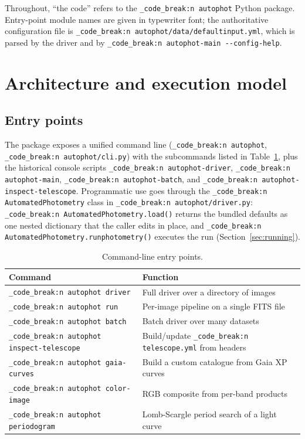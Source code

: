 \documentclass[11pt,a4paper]{article}
\renewcommand{\_}{\autophotunderscore\allowbreak}
\DeclareRobustCommand{\code}[1]{\texttt{\autophot_code_break:n {#1}}}
\begin{document}
Throughout, ``the code'' refers to the \code{autophot} Python package.
Entry-point module names are given in typewriter font; the authoritative
configuration file is \code{autophot/data/default\_input.yml}, which is
parsed by the driver and by \code{autophot-main -{}-config-help}.

\section{Architecture and execution model}
\label{sec:architecture}

\subsection{Entry points}

The package exposes a unified command line (\code{autophot},
\code{autophot/cli.py}) with the subcommands listed in
Table~\ref{tab:cli}, plus the historical console scripts
\code{autophot-driver}, \code{autophot-main}, \code{autophot-batch}, and
\code{autophot-inspect-telescope}. Programmatic use goes through the
\code{AutomatedPhotometry} class in \code{autophot/driver.py}:
\code{AutomatedPhotometry.load()} returns the bundled defaults as one
nested dictionary that the caller edits in place, and
\code{AutomatedPhotometry.run\_photometry()} executes the run
(Section~\ref{sec:running}).

\begin{table}[ht]
\centering\small
\caption{Command-line entry points.}
\label{tab:cli}
\begin{tabular}{@{}ll@{}}
\toprule
Command & Function \\
\midrule
\code{autophot driver} & Full driver over a directory of images \\
\code{autophot run} & Per-image pipeline on a single FITS file \\
\code{autophot batch} & Batch driver over many datasets \\
\code{autophot inspect-telescope} & Build/update \code{telescope.yml} from headers \\
\code{autophot gaia-curves} & Build a custom catalogue from Gaia XP curves \\
\code{autophot color-image} & RGB composite from per-band products \\
\code{autophot periodogram} & Lomb-Scargle period search of a light curve \\
\bottomrule
\end{tabular}
\end{table}
\end{document}
